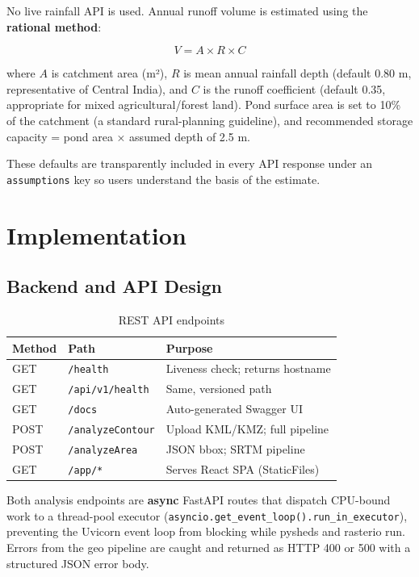 \documentclass[manuscript,screen,review]{acmart}
\begin{document}
No live rainfall API is used. Annual runoff volume is estimated
using the \textbf{rational method}:

\[
  V = A \times R \times C
\]

where $A$ is catchment area (m²), $R$ is mean annual rainfall depth
(default 0.80 m, representative of Central India), and $C$ is the
runoff coefficient (default 0.35, appropriate for mixed
agricultural/forest land). Pond surface area is set to 10\% of the
catchment (a standard rural-planning guideline), and recommended
storage capacity = pond area × assumed depth of 2.5 m.

These defaults are transparently included in every API response under
an \texttt{assumptions} key so users understand the basis of the
estimate.

\section{Implementation}
\label{sec:implementation}

\subsection{Backend and API Design}

\begin{table}[h]
  \caption{REST API endpoints}
  \label{tab:endpoints}
  \begin{tabular}{p{2.0cm}p{2.0cm}p{3.6cm}}
    \toprule
    Method & Path & Purpose \\
    \midrule
    GET  & \texttt{/health} & Liveness check; returns hostname \\
    GET  & \texttt{/api/v1/health} & Same, versioned path \\
    GET  & \texttt{/docs} & Auto-generated Swagger UI \\
    POST & \texttt{/analyzeContour} & Upload KML/KMZ; full pipeline \\
    POST & \texttt{/analyzeArea} & JSON bbox; SRTM pipeline \\
    GET  & \texttt{/app/*} & Serves React SPA (StaticFiles) \\
    \bottomrule
  \end{tabular}
\end{table}

Both analysis endpoints are \textbf{async} FastAPI routes that
dispatch CPU-bound work to a thread-pool executor
(\texttt{asyncio.get\_event\_loop().run\_in\_executor}), preventing
the Uvicorn event loop from blocking while pysheds and rasterio run.
Errors from the geo pipeline are caught and returned as HTTP 400 or
500 with a structured JSON error body.
\end{document}
